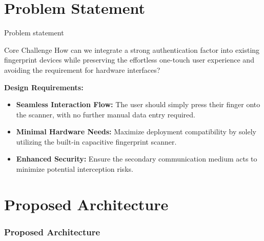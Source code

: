 \documentclass[aspectratio=169,t,xcolor=table]{beamer}
\begin{document}
\section{Problem Statement}
\begin{frame}{Problem statement}
    \begin{block}{Core Challenge}
        How can we integrate a strong authentication factor into existing fingerprint devices while preserving the effortless one-touch user experience and avoiding the requirement for hardware interfaces?
    \end{block}
    
    \vspace{1cm}
    \textbf{Design Requirements:}
    \begin{itemize}
        \item \textbf{Seamless Interaction Flow:} The user should simply press their finger onto the scanner, with no further manual data entry required.
        \item \textbf{Minimal Hardware Needs:} Maximize deployment compatibility by solely utilizing the built-in capacitive fingerprint scanner.
        \item \textbf{Enhanced Security:} Ensure the secondary communication medium acts to minimize potential interception risks.
    \end{itemize}
\end{frame}

\section{Proposed Architecture}
\begin{frame}
    \frametitle{Proposed Architecture}
\end{frame}

\end{document}
